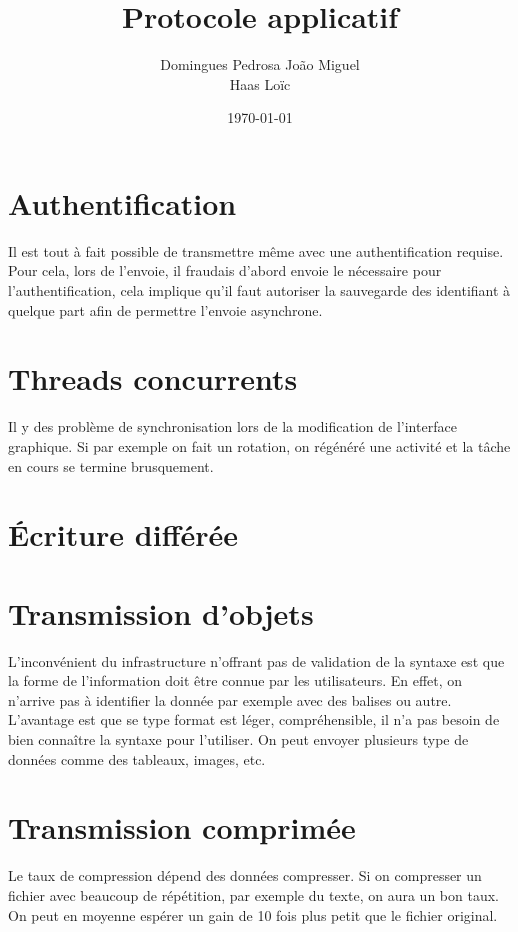 \documentclass[10pt,a4paper]{article}
\author{Domingues Pedrosa João Miguel \\ Haas Loïc}
\title{Protocole applicatif}
\date{\today}
\begin{document}
\maketitle
\newpage
\tableofcontents
\newpage


\section{Authentification}
Il est tout à fait possible de transmettre même avec une authentification requise.
Pour cela, lors de l'envoie, il fraudais d'abord envoie le nécessaire pour l'authentification, cela implique qu'il faut autoriser la sauvegarde des identifiant à quelque part afin de permettre l'envoie asynchrone.

\section{Threads concurrents}
Il y des problème de synchronisation lors de la modification de l'interface graphique. 
Si par exemple on fait un rotation, on régénéré une activité et la tâche en cours se termine brusquement.

\section{Écriture différée}

\section{Transmission d'objets}
L'inconvénient du infrastructure n'offrant pas de validation de la syntaxe est que la forme de l'information doit être connue par les utilisateurs. 
En effet, on n'arrive pas à identifier la donnée par exemple avec des balises ou autre.
L'avantage est que se type format est léger, compréhensible, il n'a pas besoin de bien connaître la syntaxe pour l'utiliser.
On peut envoyer plusieurs type de données comme des tableaux, images, etc.

\section{Transmission comprimée}
Le taux de compression dépend des données compresser. 
Si on compresser un fichier avec beaucoup de répétition, par exemple du texte, on aura un bon taux.
On peut en moyenne espérer un gain de 10 fois plus petit que le fichier original.
\end{document}
